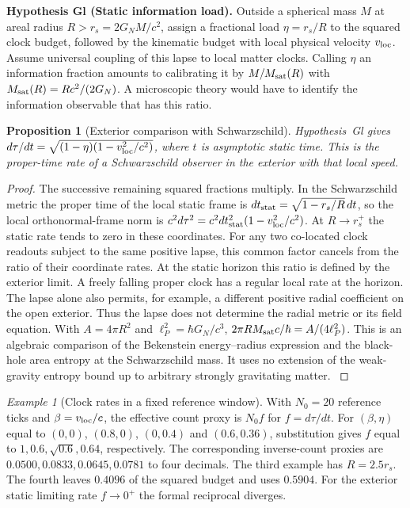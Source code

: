 \documentclass[aps,pra,onecolumn,superscriptaddress,nofootinbib,10pt]{revtex4-2}
\newtheorem{proposition}[theorem]{Proposition}
\theoremstyle{definition}
\theoremstyle{remark}
\newtheorem{example}[theorem]{Example}
\begin{document}
\smallskip\noindent\textbf{Hypothesis Gl (Static information load).}  Outside a spherical mass $M$ at areal radius $R>r_s=2G_NM/c^2$,
assign a fractional load $\eta=r_s/R$ to the squared clock
budget, followed by the kinematic budget with local physical velocity
$v_{\rm loc}$. Assume universal coupling of this lapse to local
matter clocks. Calling $\eta$ an information fraction amounts to
calibrating it by $M/M_{\rm sat}(R)$ with
$M_{\rm sat}(R)=Rc^2/(2G_N)$. A microscopic theory would have to
identify the information observable that has this ratio.


\begin{proposition}[Exterior comparison with Schwarzschild]\label{ub:lapse}
Hypothesis~Gl gives
$d\tau/dt=\sqrt{(1-\eta)(1-v_{\rm loc}^2/c^2)}$, where $t$
is asymptotic static time. This is the proper-time rate of a
Schwarzschild observer in the exterior with that local speed.
\end{proposition}
\begin{proof}
The successive remaining squared fractions multiply.
In the Schwarzschild metric the proper time of the local static
frame is $dt_{\rm stat}=\sqrt{1-r_s/R}\,dt$, so the local
orthonormal-frame norm is
$c^2d\tau^2=c^2dt_{\rm stat}^2(1-v_{\rm loc}^2/c^2)$.
At $R\longrightarrow r_s^+$ the static rate tends to zero in
these coordinates. For any two co-located clock readouts subject to
the same positive lapse, this common factor cancels from the ratio
of their coordinate rates. At the static horizon this ratio is defined
by the exterior limit. A freely falling proper clock has a regular
local rate at the horizon. The lapse alone also permits, for example,
a different positive radial coefficient on the open exterior.
Thus the lapse does not determine the radial metric or its field equation.
With $A=4\pi R^2$ and $\ell_P^2=\hbar G_N/c^3$,
$2\pi R M_{\rm sat}c/\hbar=A/(4\ell_P^2)$. This is an algebraic
comparison of the Bekenstein energy--radius expression and the
black-hole area entropy at the Schwarzschild mass. It uses no extension
of the weak-gravity entropy bound up to arbitrary strongly gravitating
matter. \cite{ub:schwarz,ub:bek,n1-hawking}
\end{proof}

\begin{example}[Clock rates in a fixed reference window]\label{ub:clocknumbers}
With $N_0=20$ reference ticks and $\beta=v_{\rm loc}/c$, the effective
count proxy is $N_0 f$ for $f=d\tau/dt$. For $(\beta,\eta)$ equal
to $(0,0)$, $(0.8,0)$, $(0,0.4)$ and $(0.6,0.36)$, substitution gives
$f$ equal to $1,0.6,\sqrt{0.6},0.64$, respectively. The corresponding
inverse-count proxies are $0.0500,0.0833,0.0645,0.0781$ to four
decimals. The third example has $R=2.5r_s$. The fourth leaves
$0.4096$ of the squared budget and uses $0.5904$. For the exterior
static limiting rate $f\to0^+$ the formal reciprocal diverges.
\end{example}
\end{document}
